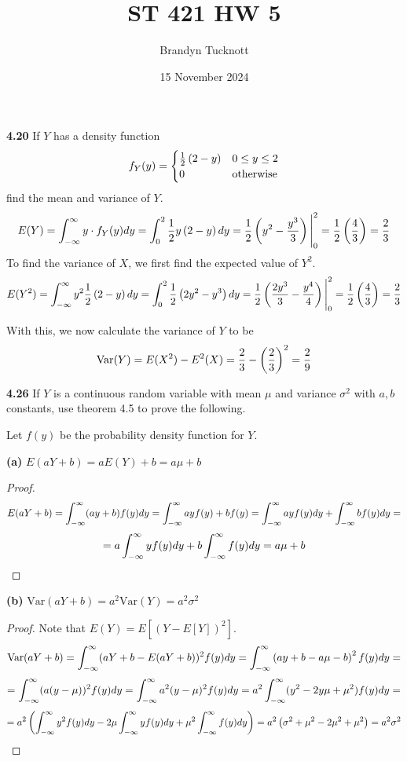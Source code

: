 \documentclass{exam}
\title{ST 421 HW 5}
\author{Brandyn Tucknott}
\date{15 November 2024}
\begin{document}
\maketitle

\begin{questions}
    \textbf{4.20 }
If $Y$ has a density function
$$f_Y(y) =
\begin{cases}
    \frac{1}{2}\left( 2 - y \right) & 0 \leq y \leq 2 \\
    0 & \text{otherwise} \\
\end{cases}$$
find the mean and variance of $Y$.
\sol
$$E(Y) = \int_{-\infty}^\infty y \cdot f_Y(y)dy = \int_0^2\frac{1}{2}y\left( 2 - y \right)dy = \frac{1}{2}\left( y^2 - \frac{y^3}{3} \right)\Bigg|_0^2 = \frac{1}{2}\left( \frac{4}{3} \right) = \frac{2}{3}$$
To find the variance of $X$, we first find the expected value of $Y^2$.
$$E(Y^2) = \int_{-\infty}^\infty y^2\frac{1}{2}\left( 2 - y \right)dy = \int_0^2 \frac{1}{2}\left( 2y^2 - y^3 \right)dy = \frac{1}{2}\left( \frac{2y^3}{3} - \frac{y^4}{4} \right)\Bigg|_0^2 = \frac{1}{2}\left( \frac{4}{3} \right) = \frac{2}{3}$$

With this, we now calculate the variance of $Y$ to be
$$\text{Var}(Y) = E(X^2) - E^2(X) = \frac{2}{3} - \left( \frac{2}{3} \right)^2 = \frac{2}{9}$$

\newpage
\textbf{4.26 }
If $Y$ is a continuous random variable with mean $\mu$ and variance $\sigma^2$ with $a, b$ constants, use theorem 4.5 to prove the following.

\newline
Let $f(y)$ be the probability density function for $Y$.

\newline
\textbf{(a) } $E(aY + b) = aE(Y) + b = a\mu + b$
\begin{proof}
    $$E(aY + b) = \int_{-\infty}^\infty (ay + b)f(y)dy = \int_{-\infty}^\infty ayf(y) + bf(y) = \int_{-\infty}^\infty ayf(y)dy + \int_{-\infty}^\infty bf(y)dy =$$
    $$= a\int_{-\infty}^\infty yf(y)dy + b\int_{-\infty}^\infty f(y)dy = a\mu + b$$
\end{proof}

\newline
\textbf{(b) } $\text{Var}(aY + b) = a^2\text{Var}(Y) = a^2\sigma^2$
\begin{proof}
Note that $E(Y)= E[(Y - E[Y])^2]$.
    $$\text{Var}(aY + b) = \int_{-\infty}^\infty (aY + b - E(aY + b))^2f(y)dy = \int_{-\infty}^\infty \left( ay + b - a\mu - b \right)^2f(y)dy =$$
    $$= \int_{-\infty}^\infty (a(y - \mu))^2f(y)dy = \int_{-\infty}^\infty a^2(y - \mu)^2f(y)dy = a^2 \int_{-\infty}^\infty (y^2 - 2y\mu + \mu^2)f(y)dy =$$
    $$= a^2\left( \int_{-\infty}^\infty y^2f(y)dy - 2\mu\int_{-\infty}^\infty yf(y)dy + \mu^2 \int_{-\infty}^\infty f(y)dy \right) = a^2\left( \sigma^2 + \mu^2 - 2\mu^2 + \mu^2 \right) = a^2\sigma^2$$
\end{proof}


\end{questions}
\end{document}
